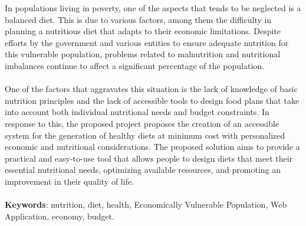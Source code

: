 
In populations living in poverty, one of the aspects that tends to be neglected is a balanced diet. This is due to various factors, among them the difficulty in planning a nutritious diet that adapts to their economic limitations. Despite efforts by the government and various entities to ensure adequate nutrition for this vulnerable population, problems related to malnutrition and nutritional imbalances continue to affect a significant percentage of the population.
\\
\\
One of the factors that aggravates this situation is the lack of knowledge of basic nutrition principles and the lack of accessible tools to design food plans that take into account both individual nutritional needs and budget constraints. In response to this, the proposed project proposes the creation of an accessible system for the generation of healthy diets at minimum cost with personalized economic and nutritional considerations. The proposed solution aims to provide a practical and easy-to-use tool that allows people to design diets that meet their essential nutritional needs, optimizing available resources, and promoting an improvement in their quality of life.
\\
\\
{\bf Keywords}: nutrition, diet, health, Economically Vulnerable Population, Web Application,
economy, budget.